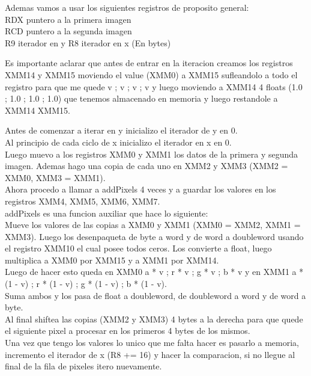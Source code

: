 Ademas vamos a usar los siguientes registros de proposito general: \\
RDX puntero a la primera imagen \\
RCD puntero a la segunda imagen \\
R9 iterador en y
R8 iterador en x (En bytes)

Es importante aclarar que antes de entrar en la iteracion creamos los registros XMM14 y XMM15 moviendo el value (XMM0) a XMM15 sufleandolo a todo el registro para que me quede v ; v ; v ; v y luego moviendo a XMM14 4 floats (1.0 ; 1.0 ; 1.0 ; 1.0) que tenemos almacenado en memoria y luego restandole a XMM14 XMM15.

Antes de comenzar a iterar en y inicializo el iterador de y en 0. \\

Al principio de cada ciclo de x inicializo el iterador en x en 0. \\

Luego muevo a los registros XMM0 y XMM1 los datos de la primera y segunda imagen. Ademas hago una copia de cada uno en XMM2 y XMM3 (XMM2 = XMM0, XMM3 = XMM1). \\

Ahora procedo a llamar a addPixels 4 veces y a guardar los valores en los registros XMM4, XMM5, XMM6, XMM7. \\

addPixels es una funcion auxiliar que hace lo siguiente: \\

Mueve los valores de las copias a XMM0 y XMM1 (XMM0 = XMM2, XMM1 = XMM3). Luego los desenpaqueta de byte a word y de word a doubleword usando el registro XMM10 el cual posee todos ceros. Los convierte a float, luego multiplica a XMM0 por XMM15 y a XMM1 por XMM14. \\

Luego de hacer esto queda en XMM0 a * v ; r * v ; g * v ; b * v y en XMM1 a * (1 - v) ; r * (1 - v) ; g * (1 - v) ; b * (1 - v). \\

Suma ambos y los pasa de float a doubleword, de doubleword a word y de word a byte. \\

Al final shiftea las copias (XMM2 y XMM3) 4 bytes a la derecha para que quede el siguiente pixel a procesar en los primeros 4 bytes de los mismos. \\

Una vez que tengo los valores lo unico que me falta hacer es pasarlo a memoria, incremento el iterador de x (R8 += 16) y hacer la comparacion, si no llegue al final de la fila de pixeles itero nuevamente. \\

